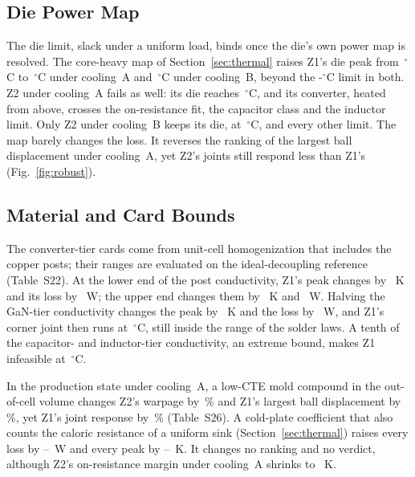 \subsection{Die Power Map}\label{sec:explore-die}
The die limit, slack under a uniform load, binds once the die's own power map is resolved. The
core-heavy map of Section~\ref{sec:thermal} raises Z1's die peak from \TdiemaxAZone\,$^\circ$C to
\WrHotAZoneDie\,$^\circ$C under cooling~A and \WrHotBZoneDie\,$^\circ$C under cooling~B, beyond the
\MthLimDie-$^\circ$C limit in both. Z2 under
cooling~A fails as well: its die reaches \WrHotAZtwoDie\,$^\circ$C, and its converter, heated from
above, crosses the on-resistance fit, the capacitor class and the inductor limit. Only Z2 under
cooling~B keeps its die, at \WrHotBZtwoDie\,$^\circ$C, and every other limit. The map barely changes
the loss. It reverses the ranking of the largest ball displacement under cooling~A, yet Z2's joints
still respond less than Z1's (Fig.~\ref{fig:robust}).

\subsection{Material and Card Bounds}\label{sec:explore-cards}
The converter-tier cards come from unit-cell homogenization that includes the copper posts; their
ranges are evaluated on the ideal-decoupling reference (Table~S22). At the lower end of
the post conductivity, Z1's peak changes by \WrPostLoZonedT~K and its loss by \WrPostLoZonedP~W; the
upper end changes them by \WrPostHiZonedT~K and \WrPostHiZonedP~W. Halving the GaN-tier conductivity
changes the peak by \WrGanHalfZonedT~K and the loss by \WrGanHalfZonedP~W, and Z1's corner joint then
runs at \WrGanHalfZoneTj\,$^\circ$C, still inside the range of the solder laws. A tenth of the
capacitor- and inductor-tier conductivity, an extreme bound, makes Z1 infeasible at
\WrKTenthZoneTmax\,$^\circ$C.

In the production state under cooling~A, a low-CTE mold compound in the out-of-cell volume changes
Z2's warpage by \MvEncEmcWarpAZtwo\,\% and Z1's largest ball displacement by \MvEncEmcDuAZone\,\%, yet
Z1's joint response by \MvEncScrEmcEpsAZone\,\% (Table~S26). A cold-plate coefficient that also counts
the caloric resistance of a uniform sink (Section~\ref{sec:thermal}) raises every loss by
\WrCalBZtwodP--\WrCalAZthreedP~W and every peak by \WrCalBZtwodT--\WrCalAZthreedT~K. It changes no
ranking and no verdict, although Z2's on-resistance margin under cooling~A shrinks to
\WrCalAZtwoRonMargin~K.

